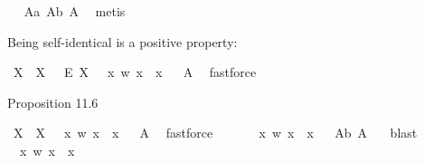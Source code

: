 \begin{isabellebody}
\isadelimproof
\ %
\endisadelimproof
%
\isatagproof
{}\isamarkupfalse%
\ A{}a\ A{}b\ A{}\ \isamarkupfalse%
\ metis%
\endisatagproof
{\isafoldproof}%
%
\isadelimproof
%
\endisadelimproof
%
\begin{isamarkuptext}%
Being self-identical is a positive property:%
\end{isamarkuptext}\isamarkuptrue%
\isamarkupfalse%
\ {\isachardoublequoteopen}{\isasymlfloor}{\isacharparenleft}\isactrlbold {\isasymexists}X{\isachardot}\ {\isasymP}\ X\ \isactrlbold {\isasymand}\ \ \isactrlbold {\isasymdiamond}\isactrlbold {\isasymexists}\isactrlsup E\ X{\isacharparenright}\ \isactrlbold {\isasymrightarrow}\ {\isasymP}\ {\isacharparenleft}{\isasymlambda}x\ w{\isachardot}\ x\ {\isacharequal}\ x{\isacharparenright}{\isasymrfloor}{\isachardoublequoteclose}%
\isadelimproof
\ %
\endisadelimproof
%
\isatagproof
{}\isamarkupfalse%
\ A{}\ \isamarkupfalse%
\ fastforce%
\endisatagproof
{\isafoldproof}%
%
\isadelimproof
%
\endisadelimproof
%
\begin{isamarkuptext}%
Proposition 11.6%
\end{isamarkuptext}\isamarkuptrue%
\isamarkupfalse%
\ {\isachardoublequoteopen}{\isasymlfloor}{\isacharparenleft}\isactrlbold {\isasymexists}X{\isachardot}\ {\isasymP}\ X{\isacharparenright}\ \isactrlbold {\isasymrightarrow}\ {\isasymP}\ {\isacharparenleft}{\isasymlambda}x\ w{\isachardot}\ x\ {\isacharequal}\ x{\isacharparenright}{\isasymrfloor}{\isachardoublequoteclose}%
\isadelimproof
\ %
\endisadelimproof
%
\isatagproof
{}\isamarkupfalse%
\ A{}\ \isamarkupfalse%
\ fastforce%
\endisatagproof
{\isafoldproof}%
%
\isadelimproof
%
\endisadelimproof
\isanewline
\ \ \ \ \isanewline
{}\isamarkupfalse%
\ {\isachardoublequoteopen}{\isasymlfloor}{\isasymP}\ {\isacharparenleft}{\isasymlambda}x\ w{\isachardot}\ x\ {\isacharequal}\ x{\isacharparenright}{\isasymrfloor}{\isachardoublequoteclose}%
\isadelimproof
\ %
\endisadelimproof
%
\isatagproof
{}\isamarkupfalse%
\ A{}b\ A{}\ \ \isamarkupfalse%
\ blast%
\endisatagproof
{\isafoldproof}%
%
\isadelimproof
%
\endisadelimproof
\isanewline
{}\isamarkupfalse%
\ {\isachardoublequoteopen}{\isasymlfloor}{\isasymP}\ {\isacharparenleft}{\isasymlambda}x\ w{\isachardot}\ x\ {\isacharequal}\ x{\isacharparenright}{\isasymrfloor}{\isachardoublequoteclose}%
\isadelimproof

\end{isabellebody}
